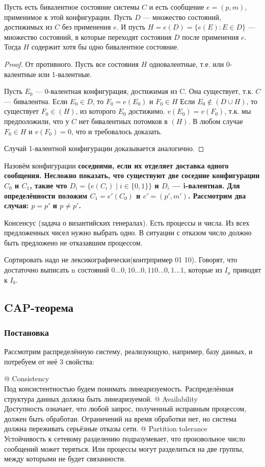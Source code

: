 \begin{thm}
Пусть есть бивалентное состояние системы $C$ и есть сообщение $e = (p, m)$, применимое к этой конфигурации. Пусть $D$ --- множество состояний, достижимых из $C$ без применения $e$. И пусть $H = e(D) = \{e(E) : E \in D\}$ --- множество состояний, в которые переходят состояния $D$ после применения $e$. Тогда $H$ содержит хотя бы одно бивалентное состояние.
\end{thm}
\begin{proof}
От противного. Пусть все состояния $H$ одновалентные, т.е. или 0-валентные или 1-валентные.

Пусть $E_0$ --- 0-валентная конфигурация, достижимая из C. Она существует, т.к. $C$ --- бивалентна.
Если $E_0 \in D$, то $F_0 = e(E_0)$ и $F_0 \in H$
Если $E_0 \not\in (D \cup H)$, то существует $F_0 \in (H)$, из которого $E_0$ достижимо.
$v(E_0) = v(F_0)$, т.к. мы предположили, что у $C$ нет бивалентных потомков в $(H)$.
В любом случае $F_0 \in H$ и $v(F_0) = 0$, что и требовалось доказать.

Случай 1-валентной конфигурации доказывается аналогично.
\end{proof}

Назовём конфигурации \bf{соседними}, если их отделяет доставка одного сообщения.
Несложно показать, что существуют две соседние конфигурации $C_0$ и $C_1$, такие что $D_i = \{e(C_i) \mid i \in \{0, 1\}\}$ и $D_i$ --- i-валентная.
Для определённости положим $C_1 = e'(C_0)$ и $e' = (p', m')$.
Рассмотрим два случая: $p = p'$ и $p \ne p'$.

Консенсус (задача о византийских генералах). Есть процессы и числа. Из всех предложенных чисел нужно выбрать одно. В ситуации с отказом число должно быть предложено не отказавшим процессом. 

Сортировать надо не лексикографически(контрпример 01 10). Говорят, что достаточно выписать n состояний $0\dots0, 10\dots0, 110\dots0, 1\dots1$, которые из $I_a$  приводят к $I_b$. 


\subsection{CAP-теорема}
\subsubsection{Постановка}
Рассмотрим распределённую систему, реализующую, например, базу данных, и потребуем от неё 3 свойства:
\begin{el}[ul]
@ Consistency \\
Под консистентностью будем понимать линеаризуемость. Распределённая структура данных должна быть линеаризуемой.
@ Availability \\
Доступность означает, что любой запрос, полученный исправным процессом, должен быть обработан. Ограничений на время обработки нет, но система должна переживать серьёзные отказы сети.
@ Partition tolerance \\
Устойчивость к сетевому разделению подразумевает, что произвольное число сообщений может теряться. Или процессы могут разделиться на две группы, между которыми не будет связанности.
\end{el}

